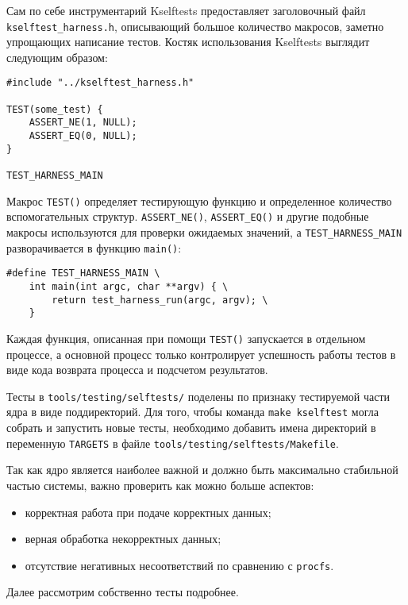 Сам по себе инструментарий Kselftests предоставляет заголовочный файл
\texttt{kselftest\_harness.h}, описывающий большое количество макросов, заметно
упрощающих написание тестов. Костяк использования Kselftests выглядит следующим
образом:
\medskip
\begin{lstlisting}[style=cstyle]
#include "../kselftest_harness.h"

TEST(some_test) {
	ASSERT_NE(1, NULL);
	ASSERT_EQ(0, NULL);
}

TEST_HARNESS_MAIN
\end{lstlisting}
\medskip

Макрос \texttt{TEST()} определяет тестирующую функцию и определенное количество
вспомогательных структур. \texttt{ASSERT\_NE()}, \texttt{ASSERT\_EQ()} и другие
подобные макросы используются для проверки ожидаемых значений, а
\texttt{TEST\_HARNESS\_MAIN} разворачивается в функцию \texttt{main()}:
\medskip
\begin{lstlisting}[style=cstyle]
#define TEST_HARNESS_MAIN \
	int main(int argc, char **argv) { \
		return test_harness_run(argc, argv); \
	}
\end{lstlisting}
\medskip

Каждая функция, описанная при помощи \texttt{TEST()} запускается в отдельном
процессе, а основной процесс только контролирует успешность работы тестов в виде
кода возврата процесса и подсчетом результатов.

Тесты в \texttt{tools/testing/selftests/} поделены по признаку тестируемой части
ядра в виде поддиректорий. Для того, чтобы команда \texttt{make kselftest} могла
собрать и запустить новые тесты, необходимо добавить имена директорий в
переменную \texttt{TARGETS} в файле \texttt{tools/testing/selftests/Makefile}.

Так как ядро является наиболее важной и должно быть максимально стабильной частью
системы, важно проверить как можно больше аспектов:
\begin{itemize}
\item корректная работа при подаче корректных данных;
\item верная обработка некорректных данных;
\item отсутствие негативных несоответствий по сравнению с \texttt{procfs}.
\end{itemize}

Далее рассмотрим собственно тесты подробнее.
